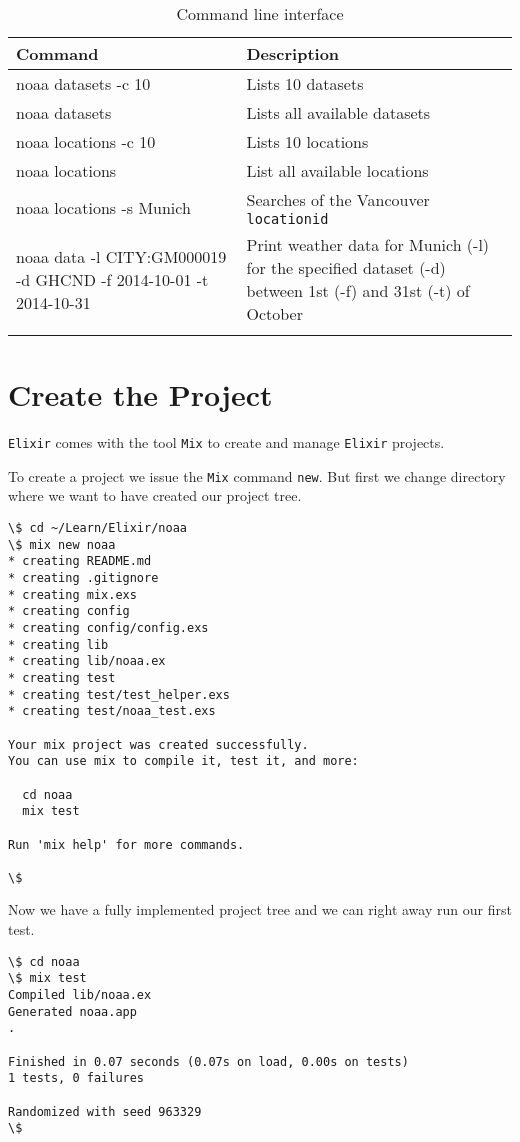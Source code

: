 \documentclass[10pt, a4paper]{article}
\begin{document}
\begin{table}[h]\footnotesize
  \caption{Command line interface}
  \begin{tabular}{p{5cm} p{7cm}}
    \hline
    \textbf{Command} & \textbf{Description} \\
    \hline
    noaa datasets -c 10 & Lists 10 datasets \\
    noaa datasets & Lists all available datasets \\
    noaa locations -c 10 & Lists 10 locations \\
    noaa locations & List all available locations \\
    noaa locations -s Munich & Searches of the Vancouver 
    \texttt{locationid} \\
    noaa data -l CITY:GM000019 -d GHCND -f 2014-10-01 -t 2014-10-31 &
    Print weather data for Munich (-l) for the specified dataset (-d)
    between 1st (-f) and 31st (-t) of October \\
    \hline
    \label{tbl:cli}
  \end{tabular}
\end{table}

\section{Create the Project}
\texttt{Elixir} comes with the tool \texttt{Mix} to create and manage 
\texttt{Elixir} projects.

To create a project we issue the \texttt{Mix} command \texttt{new}. But first
we change directory where we want to have created our project tree.

\begin{verbatim}
\$ cd ~/Learn/Elixir/noaa
\$ mix new noaa
* creating README.md
* creating .gitignore
* creating mix.exs
* creating config
* creating config/config.exs
* creating lib
* creating lib/noaa.ex
* creating test
* creating test/test_helper.exs
* creating test/noaa_test.exs

Your mix project was created successfully.
You can use mix to compile it, test it, and more:

  cd noaa
  mix test

Run 'mix help' for more commands.

\$
\end{verbatim}

Now we have a fully implemented project tree and we can right away run our 
first test.

\begin{verbatim}
\$ cd noaa
\$ mix test
Compiled lib/noaa.ex
Generated noaa.app
.

Finished in 0.07 seconds (0.07s on load, 0.00s on tests)
1 tests, 0 failures

Randomized with seed 963329
\$
\end{verbatim}
\end{document}
